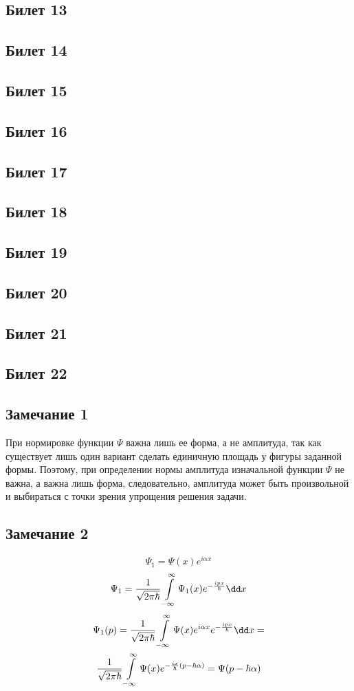 \subsection{Билет 13}

\subsection{Билет 14}

\subsection{Билет 15}

\subsection{Билет 16}

\subsection{Билет 17}

\subsection{Билет 18}

\subsection{Билет 19}

\subsection{Билет 20}

\subsection{Билет 21}

\subsection{Билет 22}



\subsection{Замечание 1}
При нормировке функции $\Psi$ важна лишь ее форма, а не амплитуда, так как
существует лишь один вариант сделать единичную площадь у фигуры
заданной формы. Поэтому, при определении нормы амплитуда изначальной
функции $\Psi$ не важна, а важна лишь форма, следовательно, амплитуда
может быть произвольной и выбираться с точки зрения упрощения решения
задачи.
\subsection{Замечание 2}
$$\Psi_1=\Psi(x)e^{i \alpha x} $$
$$\Psi_1 = \frac{1}{\sqrt{2\pi\hbar}}\infint \Psi_1(x) e^{-\frac{ipx}{\hbar}} \dd x$$
\begin{gather}
\Psi_1(p)=\frac{1}{\sqrt{2\pi\hbar}}\infint \Psi(x) e^{i \alpha x} e^{-\frac{ipx}{\hbar}} \dd x =\\
\frac{1}{\sqrt{2\pi\hbar}}\infint \Psi(x) e^{-\frac{ix}{\hbar}(p-\hbar \alpha)}=\Psi(p-\hbar \alpha)
\end{gather}

